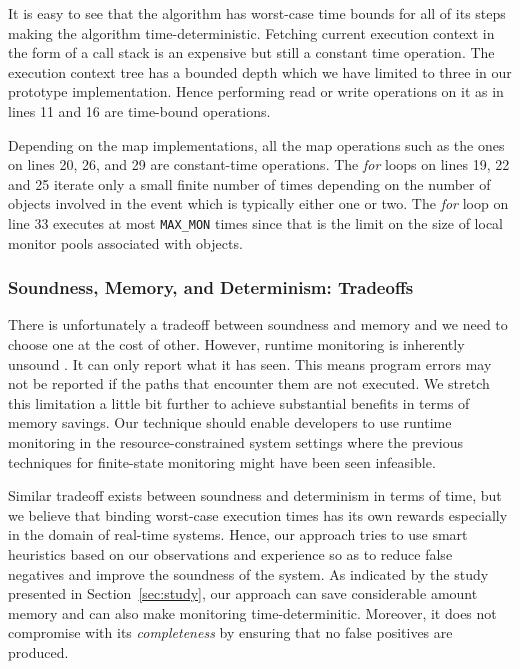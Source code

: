 It is easy to see that the algorithm has worst-case time bounds for all of its 
steps making the algorithm time-deterministic. Fetching current execution 
context in the form of a call stack is an expensive but still a constant time 
operation. The execution context tree has a bounded depth which we have limited 
to three in our prototype implementation. Hence performing read or write 
operations on it as in lines 11 and 16 are time-bound operations.

Depending on the map implementations, all the map operations such as the ones on 
lines 20, 26, and 29 are constant-time operations. The \textit{for} loops on 
lines 19, 22 and 25 iterate only a small finite number of times depending on the 
number of objects involved in the event which is typically either one or two. 
The \textit{for} loop on line 33 executes at most \texttt{MAX\_MON} times since 
that is the limit on the size of local monitor pools associated with objects.

\subsubsection{Soundness, Memory, and Determinism: Tradeoffs}
\label{subsubsec:tradeoff}

There is unfortunately a tradeoff between soundness and memory and we need to 
choose one at the cost of other. However, runtime monitoring is inherently 
unsound \cite{}. It can only report what it has seen. This means program errors 
may not be reported if the paths that encounter them are not executed. We 
stretch this limitation a little bit further to achieve substantial benefits in 
terms of memory savings. Our technique should enable developers to use runtime 
monitoring in the resource-constrained system settings where the previous 
techniques for finite-state monitoring might have been seen infeasible.

Similar tradeoff exists between soundness and determinism in terms of time, but 
we believe that binding worst-case execution times has its own rewards 
especially in the domain of real-time systems. Hence, our approach tries to use 
smart heuristics based on our observations and experience so as to reduce false 
negatives and improve the soundness of the system. As indicated by the study 
presented in Section~\ref{sec:study}, our approach can save considerable amount 
memory and can also make monitoring time-determinitic. Moreover, it does not 
compromise with its \textit{completeness} by ensuring that no false positives 
are produced.

